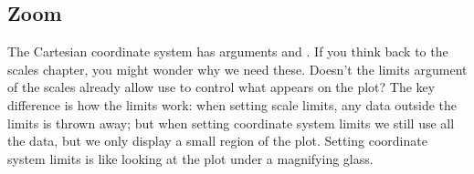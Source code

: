 \subsection{Zoom}
\label{sub:zoom}

The Cartesian coordinate system has arguments  and .  If you think back to the scales chapter, you might wonder why we need these.  Doesn't the limits argument of the scales already allow use to control what appears on the plot?  The key difference is how the limits work: when setting scale limits, any data outside the limits is thrown away; but when setting coordinate system limits we still use all the data, but we only display a small region of the plot.  Setting coordinate system limits is like looking at the plot under a magnifying glass.

% 
% 
% 
% 
% 
% 



